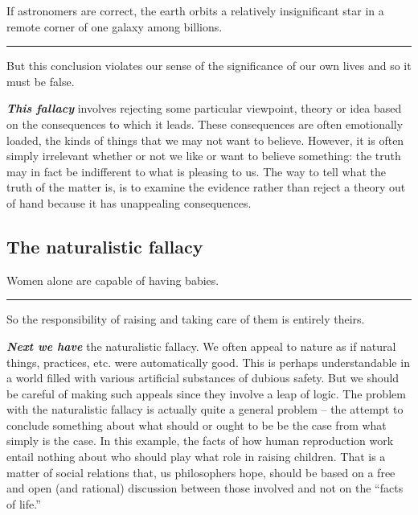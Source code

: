 \documentclass[]{book}
\makeatletter
\newenvironment{kframe}{%
\medskip{}
\setlength{\fboxsep}{.8em}
 \def\at@end@of@kframe{}%
 \ifinner\ifhmode%
  \def\at@end@of@kframe{\end{minipage}}%
  \begin{minipage}{\columnwidth}%
 \fi\fi%
 \def\FrameCommand##1{\hskip\@totalleftmargin \hskip-\fboxsep
 \colorbox{shadecolor}{##1}\hskip-\fboxsep
     \hskip-\linewidth \hskip-\@totalleftmargin \hskip\columnwidth}%
 \MakeFramed {\advance\hsize-\width
   \@totalleftmargin\z@ \linewidth\hsize
   \@setminipage}}%
 {\par\unskip\endMakeFramed%
 \at@end@of@kframe}
\newenvironment{rmdblock}[1]
  {
  \begin{itemize}
  \renewcommand{\labelitemi}{
    \raisebox{-.7\height}[0pt][0pt]{
      {\setkeys{Gin}{width=3em,keepaspectratio}\texttt{[image: img/\#1]}}
    }
  }
  \setlength{\fboxsep}{1em}
  \begin{kframe}
  \item
  }
  {
  \end{kframe}
  \end{itemize}
  }
\newenvironment{rmdwarning}
  {\begin{rmdblock}{warning}}
  {\end{rmdblock}}
\makeatother
\begin{document}
\begin{rmdwarning}
If astronomers are correct, the earth orbits a relatively insignificant
star in a remote corner of one galaxy among billions.

\begin{center}\rule{0.5\linewidth}{\linethickness}\end{center}

But this conclusion violates our sense of the significance of our own
lives and so it must be false.
\end{rmdwarning}

\textbf{\emph{This fallacy}} involves rejecting some particular viewpoint, theory or idea based on the consequences to which it leads. These consequences are often emotionally loaded, the kinds of things that we may not want to believe. However, it is often simply irrelevant whether or not we like or want to believe something: the truth may in fact be indifferent to what is pleasing to us. The way to tell what the truth of the matter is, is to examine the evidence rather than reject a theory out of hand because it has unappealing consequences.

\hypertarget{the-naturalistic-fallacy}{%
\subsection*{The naturalistic fallacy}\label{the-naturalistic-fallacy}}


\begin{rmdwarning}
Women alone are capable of having babies.

\begin{center}\rule{0.5\linewidth}{\linethickness}\end{center}

So the responsibility of raising and taking care of them is entirely
theirs.
\end{rmdwarning}

\textbf{\emph{Next we have}} the naturalistic fallacy. We often appeal to nature as if natural things, practices, etc. were automatically good. This is perhaps understandable in a world filled with various artificial substances of dubious safety. But we should be careful of making such appeals since they involve a leap of logic. The problem with the naturalistic fallacy is actually quite a general problem -- the attempt to conclude something about what should or ought to be be the case from what simply is the case. In this example, the facts of how human reproduction work entail nothing about who should play what role in raising children. That is a matter of social relations that, us philosophers hope, should be based on a free and open (and rational) discussion between those involved and not on the ``facts of life.''
\end{document}
